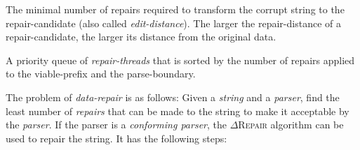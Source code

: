 \documentclass[sigconf,review,anonymous]{acmart}
\def\Rvalid{\texttt{\color{validcolor}\textbf{$\checkmark$}}\xspace}
\newcommand{\pass}{\text{\Rvalid}\xspace}
\newcommand{\approach}{\textsc{$\Delta$Repair}\xspace}
\newcommand{\drepair}{\approach}
\begin{document}
\begin{description}[labelwidth=!, labelindent=0pt]
\item[repair-distance] The minimal number of repairs required to transform the corrupt
string to the repair-candidate (also called \emph{edit-distance}). The larger the
repair-distance of a repair-candidate, the larger its distance from the original data.

\item[thread-queue] A priority queue of \emph{repair-threads} that is sorted by the
number of repairs applied to the viable-prefix and the parse-boundary.
\end{description}

The problem of \emph{data-repair} is as follows: Given a \emph{string} and a
\emph{parser}, find the least number of \emph{repairs} that can be made to
the string to make it acceptable by the \emph{parser}. If the parser is a
\emph{conforming parser}, the \drepair algorithm can be used to
repair the string. It has the following steps: 

\end{document}
